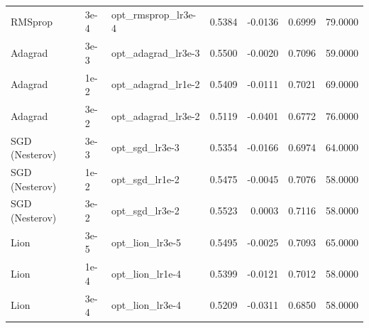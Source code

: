 \begin{table}
\begin{tabular}{lllrrrr}
RMSprop & 3e-4 & opt\_rmsprop\_lr3e-4 & 0.5384 & -0.0136 & 0.6999 & 79.0000 \\
Adagrad & 3e-3 & opt\_adagrad\_lr3e-3 & 0.5500 & -0.0020 & 0.7096 & 59.0000 \\
Adagrad & 1e-2 & opt\_adagrad\_lr1e-2 & 0.5409 & -0.0111 & 0.7021 & 69.0000 \\
Adagrad & 3e-2 & opt\_adagrad\_lr3e-2 & 0.5119 & -0.0401 & 0.6772 & 76.0000 \\
SGD (Nesterov) & 3e-3 & opt\_sgd\_lr3e-3 & 0.5354 & -0.0166 & 0.6974 & 64.0000 \\
SGD (Nesterov) & 1e-2 & opt\_sgd\_lr1e-2 & 0.5475 & -0.0045 & 0.7076 & 58.0000 \\
SGD (Nesterov) & 3e-2 & opt\_sgd\_lr3e-2 & 0.5523 & 0.0003 & 0.7116 & 58.0000 \\
Lion & 3e-5 & opt\_lion\_lr3e-5 & 0.5495 & -0.0025 & 0.7093 & 65.0000 \\
Lion & 1e-4 & opt\_lion\_lr1e-4 & 0.5399 & -0.0121 & 0.7012 & 58.0000 \\
Lion & 3e-4 & opt\_lion\_lr3e-4 & 0.5209 & -0.0311 & 0.6850 & 58.0000 \\
\bottomrule
\end{tabular}
\end{table}
